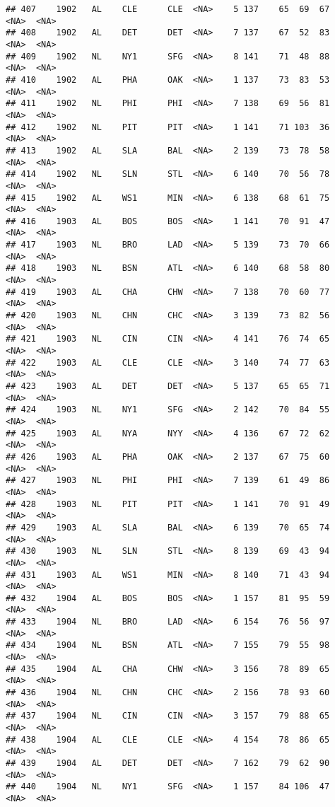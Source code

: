 \documentclass[]{article}
\begin{document}
\begin{verbatim}
## 407    1902   AL    CLE      CLE  <NA>    5 137    65  69  67   <NA>  <NA>
## 408    1902   AL    DET      DET  <NA>    7 137    67  52  83   <NA>  <NA>
## 409    1902   NL    NY1      SFG  <NA>    8 141    71  48  88   <NA>  <NA>
## 410    1902   AL    PHA      OAK  <NA>    1 137    73  83  53   <NA>  <NA>
## 411    1902   NL    PHI      PHI  <NA>    7 138    69  56  81   <NA>  <NA>
## 412    1902   NL    PIT      PIT  <NA>    1 141    71 103  36   <NA>  <NA>
## 413    1902   AL    SLA      BAL  <NA>    2 139    73  78  58   <NA>  <NA>
## 414    1902   NL    SLN      STL  <NA>    6 140    70  56  78   <NA>  <NA>
## 415    1902   AL    WS1      MIN  <NA>    6 138    68  61  75   <NA>  <NA>
## 416    1903   AL    BOS      BOS  <NA>    1 141    70  91  47   <NA>  <NA>
## 417    1903   NL    BRO      LAD  <NA>    5 139    73  70  66   <NA>  <NA>
## 418    1903   NL    BSN      ATL  <NA>    6 140    68  58  80   <NA>  <NA>
## 419    1903   AL    CHA      CHW  <NA>    7 138    70  60  77   <NA>  <NA>
## 420    1903   NL    CHN      CHC  <NA>    3 139    73  82  56   <NA>  <NA>
## 421    1903   NL    CIN      CIN  <NA>    4 141    76  74  65   <NA>  <NA>
## 422    1903   AL    CLE      CLE  <NA>    3 140    74  77  63   <NA>  <NA>
## 423    1903   AL    DET      DET  <NA>    5 137    65  65  71   <NA>  <NA>
## 424    1903   NL    NY1      SFG  <NA>    2 142    70  84  55   <NA>  <NA>
## 425    1903   AL    NYA      NYY  <NA>    4 136    67  72  62   <NA>  <NA>
## 426    1903   AL    PHA      OAK  <NA>    2 137    67  75  60   <NA>  <NA>
## 427    1903   NL    PHI      PHI  <NA>    7 139    61  49  86   <NA>  <NA>
## 428    1903   NL    PIT      PIT  <NA>    1 141    70  91  49   <NA>  <NA>
## 429    1903   AL    SLA      BAL  <NA>    6 139    70  65  74   <NA>  <NA>
## 430    1903   NL    SLN      STL  <NA>    8 139    69  43  94   <NA>  <NA>
## 431    1903   AL    WS1      MIN  <NA>    8 140    71  43  94   <NA>  <NA>
## 432    1904   AL    BOS      BOS  <NA>    1 157    81  95  59   <NA>  <NA>
## 433    1904   NL    BRO      LAD  <NA>    6 154    76  56  97   <NA>  <NA>
## 434    1904   NL    BSN      ATL  <NA>    7 155    79  55  98   <NA>  <NA>
## 435    1904   AL    CHA      CHW  <NA>    3 156    78  89  65   <NA>  <NA>
## 436    1904   NL    CHN      CHC  <NA>    2 156    78  93  60   <NA>  <NA>
## 437    1904   NL    CIN      CIN  <NA>    3 157    79  88  65   <NA>  <NA>
## 438    1904   AL    CLE      CLE  <NA>    4 154    78  86  65   <NA>  <NA>
## 439    1904   AL    DET      DET  <NA>    7 162    79  62  90   <NA>  <NA>
## 440    1904   NL    NY1      SFG  <NA>    1 157    84 106  47   <NA>  <NA>

\end{verbatim}
\end{document}
